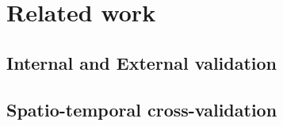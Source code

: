 \documentclass{article}
\begin{document}
\section{Related work}

\subsection{Internal and External validation}
 
	
	

	
	





\subsection{Spatio-temporal cross-validation}
\end{document}
